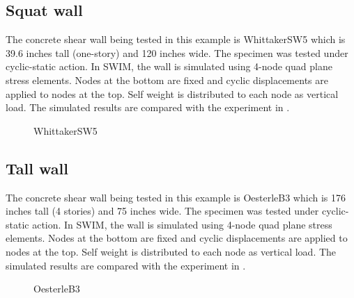 \subsection{Squat wall}

The concrete shear wall being tested in this example is WhittakerSW5 which is 39.6 inches tall (one-story) and 120 inches wide. 
The specimen was tested under cyclic-static action. 
In SWIM, the wall is simulated using 4-node quad plane stress elements. 
Nodes at the bottom are fixed and cyclic displacements are applied to nodes at the top. 
Self weight is distributed to each node as vertical load.
The simulated results are compared with the experiment in .



\begin{figure}[!htbp]
  \caption{WhittakerSW5}
  \label{fig:WhittSW5}
\end{figure}




\subsection{Tall wall}

The concrete shear wall being tested in this example is OesterleB3 which is 176 inches tall (4 stories) and 75 inches wide. 
The specimen was tested under cyclic-static action. 
In SWIM, the wall is simulated using 4-node quad plane stress elements. 
Nodes at the bottom are fixed and cyclic displacements are applied to nodes at the top. 
Self weight is distributed to each node as vertical load.
The simulated results are compared with the experiment in .


\begin{figure}[!htbp]
  \caption{OesterleB3}
  \label{fig:OesterleB3}
\end{figure}

